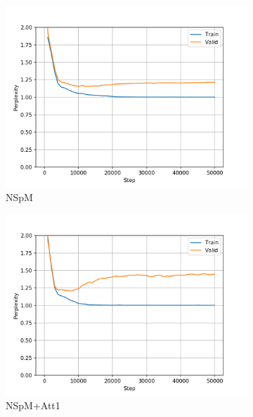 \begin{figure}[h]
\centering
\begin{subfigure}{0.3\textwidth}
\includegraphics[width=\textwidth]{../results/monument2_1/run1/neural_sparql_machine/ppls.png} 
\caption{NSpM}
\label{fig:monu1 nsm ppl}
\end{subfigure}
\hfill
\begin{subfigure}{0.3\textwidth}
\includegraphics[width=\textwidth]{../results/monument2_1/run1/neural_sparql_machine_bahdanau_attention/ppls.png}
\caption{NSpM+Att1}
\label{fig:monu1 nsm-bah ppl}
\end{subfigure}
\hfill
\begin{subfigure}{0.3\textwidth}

\end{subfigure}
\end{figure}
